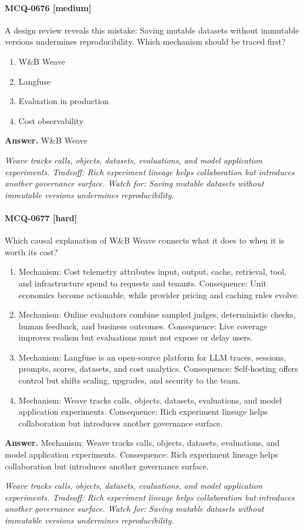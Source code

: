 \paragraph{MCQ-0676 [medium]} A design review reveals this mistake: Saving mutable datasets without immutable versions undermines reproducibility. Which mechanism should be traced first?
\begin{enumerate}[label=\Alph*.]
\item W\&B Weave
\item Langfuse
\item Evaluation in production
\item Cost observability
\end{enumerate}
\noindent\textbf{Answer.} W\&B Weave
\par\textit{Weave tracks calls, objects, datasets, evaluations, and model application experiments. Tradeoff: Rich experiment lineage helps collaboration but introduces another governance surface. Watch for: Saving mutable datasets without immutable versions undermines reproducibility.}
\paragraph{MCQ-0677 [hard]} Which causal explanation of W\&B Weave connects what it does to when it is worth its cost?
\begin{enumerate}[label=\Alph*.]
\item Mechanism: Cost telemetry attributes input, output, cache, retrieval, tool, and infrastructure spend to requests and tenants. Consequence: Unit economics become actionable, while provider pricing and caching rules evolve.
\item Mechanism: Online evaluators combine sampled judges, deterministic checks, human feedback, and business outcomes. Consequence: Live coverage improves realism but evaluations must not expose or delay users.
\item Mechanism: Langfuse is an open-source platform for LLM traces, sessions, prompts, scores, datasets, and cost analytics. Consequence: Self-hosting offers control but shifts scaling, upgrades, and security to the team.
\item Mechanism: Weave tracks calls, objects, datasets, evaluations, and model application experiments. Consequence: Rich experiment lineage helps collaboration but introduces another governance surface.
\end{enumerate}
\noindent\textbf{Answer.} Mechanism: Weave tracks calls, objects, datasets, evaluations, and model application experiments. Consequence: Rich experiment lineage helps collaboration but introduces another governance surface.
\par\textit{Weave tracks calls, objects, datasets, evaluations, and model application experiments. Tradeoff: Rich experiment lineage helps collaboration but introduces another governance surface. Watch for: Saving mutable datasets without immutable versions undermines reproducibility.}
